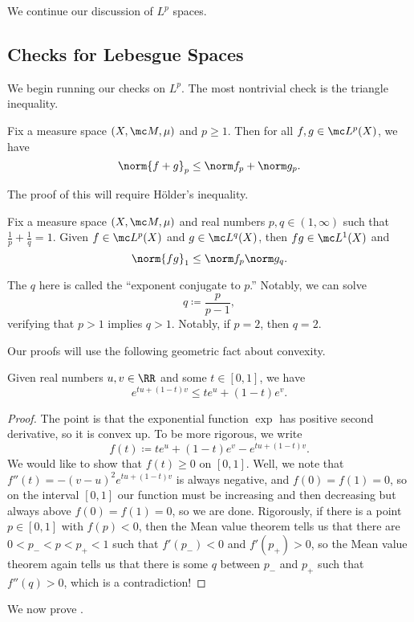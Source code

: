 \documentclass[../notes.tex]{subfiles}
\begin{document}
We continue our discussion of $L^p$ spaces.

\subsection{Checks for Lebesgue Spaces}
We begin running our checks on $L^p$. The most nontrivial check is the triangle inequality.
\begin{proposition} \label{prop:mink-ineq}
	Fix a measure space $(X,\mc M,\mu)$ and $p\ge1$. Then for all $f,g\in\mc L^p(X)$, we have
	\[\norm{f+g}_p\le\norm f_p+\norm g_p.\]
\end{proposition}
The proof of this will require H\"older's inequality.
\begin{proposition} \label{prop:holder-ineq}
	Fix a measure space $(X,\mc M,\mu)$ and real numbers $p,q\in(1,\infty)$ such that $\frac1p+\frac1q=1$. Given $f\in\mc L^p(X)$ and $g\in\mc L^q(X)$, then $fg\in\mc L^1(X)$ and
	\[\norm{fg}_1\le\norm f_p\norm g_q.\]
\end{proposition}
\begin{remark}
	The $q$ here is called the ``exponent conjugate to $p$.'' Notably, we can solve
	\[q\coloneqq\frac p{p-1},\]
	verifying that $p>1$ implies $q>1$. Notably, if $p=2$, then $q=2$.
\end{remark}
Our proofs will use the following geometric fact about convexity.
\begin{lemma} \label{lem:exp-concave-up}
	Given real numbers $u,v\in\RR$ and some $t\in[0,1]$, we have
	\[e^{tu+(1-t)v}\le te^u+(1-t)e^v.\]
\end{lemma}
\begin{proof}
	The point is that the exponential function $\exp$ has positive second derivative, so it is convex up. To be more rigorous, we write
	\[f(t)\coloneqq te^u+(1-t)e^v-e^{tu+(1-t)v}.\]
	We would like to show that $f(t)\ge0$ on $[0,1]$. Well, we note that $f''(t)=-(v-u)^2e^{tu+(1-t)v}$ is always negative, and $f(0)=f(1)=0$, so on the interval $[0,1]$ our function must be increasing and then decreasing but always above $f(0)=f(1)=0$, so we are done. Rigorously, if there is a point $p\in[0,1]$ with $f(p)<0$, then the Mean value theorem tells us that there are $0<p_-<p<p_+<1$ such that $f'(p_-)<0$ and $f'(p_+)>0$, so the Mean value theorem again tells us that there is some $q$ between $p_-$ and $p_+$ such that $f''(q)>0$, which is a contradiction!
\end{proof}
We now prove .
\end{document}
